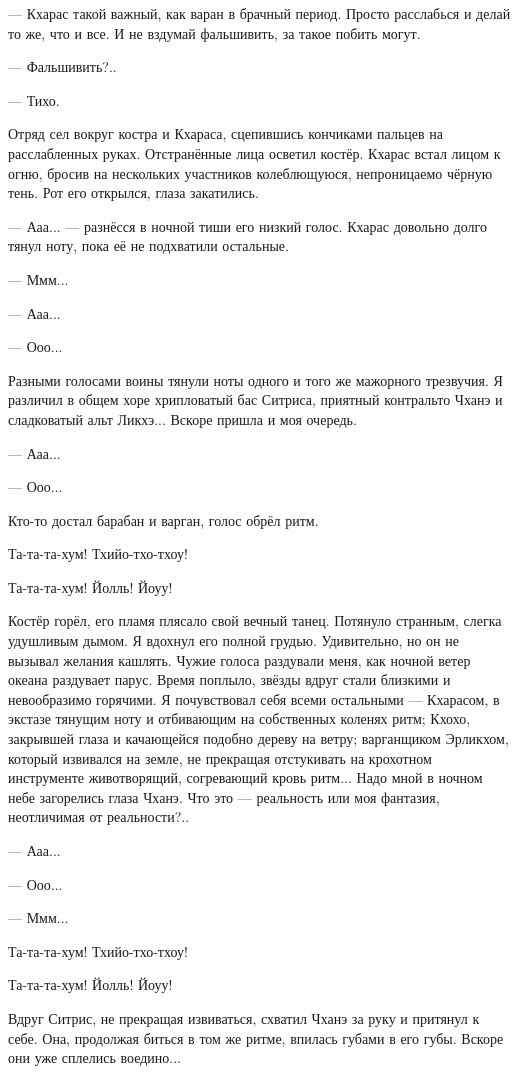 --- Кхарас такой важный, как варан в брачный период.
Просто расслабься и делай то же, что и все.
И не вздумай фальшивить, за такое побить могут.

--- Фальшивить?..

--- Тихо.

Отряд сел вокруг костра и Кхараса, сцепившись кончиками пальцев на расслабленных руках.
Отстранённые лица осветил костёр. Кхарас встал лицом к огню, бросив на нескольких участников колеблющуюся, непроницаемо чёрную тень.
Рот его открылся, глаза закатились.

--- Ааа... --- разнёсся в ночной тиши его низкий голос.
Кхарас довольно долго тянул ноту, пока её не подхватили остальные.

--- Ммм...

--- Ааа...

--- Ооо...

Разными голосами воины тянули ноты одного и того же мажорного трезвучия.
Я различил в общем хоре хрипловатый бас Ситриса, приятный контральто Чханэ и сладковатый альт Ликхэ...
Вскоре пришла и моя очередь.

--- Ааа...

--- Ооо...

Кто-то достал барабан и варган, голос обрёл ритм.

Та-та-та-хум!
Тхийо-тхо-тхоу!

Та-та-та-хум!
Йолль!
Йоуу!

Костёр горёл, его пламя плясало свой вечный танец.
Потянуло странным, слегка удушливым дымом.
Я вдохнул его полной грудью.
Удивительно, но он не вызывал желания кашлять.
Чужие голоса раздували меня, как ночной ветер океана раздувает парус.
Время поплыло, звёзды вдруг стали близкими и невообразимо горячими.
Я почувствовал себя всеми остальными --- Кхарасом, в экстазе тянущим ноту и отбивающим на собственных коленях ритм;
Кхохо, закрывшей глаза и качающейся подобно дереву на ветру;
варганщиком Эрликхом, который извивался на земле, не прекращая отстукивать на крохотном инструменте животворящий, согревающий кровь ритм...
Надо мной в ночном небе загорелись глаза Чханэ.
Что это --- реальность или моя фантазия, неотличимая от реальности?..

--- Ааа...

--- Ооо...

--- Ммм...

Та-та-та-хум!
Тхийо-тхо-тхоу!

Та-та-та-хум!
Йолль!
Йоуу!

Вдруг Ситрис, не прекращая извиваться, схватил Чханэ за руку и притянул к себе.
Она, продолжая биться в том же ритме, впилась губами в его губы.
Вскоре они уже сплелись воедино...

